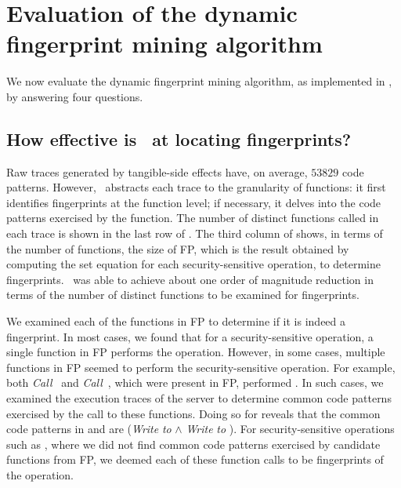 \section{Evaluation of the dynamic fingerprint mining algorithm}
\label{chapter:dynamic:evaluation}

We now evaluate the dynamic fingerprint mining algorithm, as implemented in
\aid, by answering four questions.

%
\subsection{How effective is \aid\ at locating fingerprints?} 
%
Raw traces generated by tangible-side effects have, on average, $53829$
code patterns. However, \aid\ abstracts each trace to the granularity of
functions: it first identifies fingerprints at the function level; if
necessary, it delves into the code patterns exercised by the function. The
number of distinct functions called in each trace is shown in the last row of
.  The third column of
 shows, in terms of the number of functions, the
size of FP, which is the result obtained by computing the set equation for each
security-sensitive operation, to determine fingerprints. \aid\ was able to
achieve about one order of magnitude reduction in terms of the number of
distinct functions to be examined for fingerprints.

We examined each of the functions in FP to determine if it is indeed a
fingerprint. In most cases, we found that for a security-sensitive operation, a
single function in FP performs the operation.  However, in some cases, multiple
functions in FP seemed to perform the security-sensitive operation. For
example, both \textit{Call}~ and
\textit{Call}~, which were present in FP, performed
. In such cases, we examined the execution traces of the server
to determine common code patterns exercised by the call to these functions.
Doing so for  reveals that the common code patterns in
 and  are (\textit{Write} 
\textit{to}  $\wedge$ \textit{Write} 
\textit{to} ). For security-sensitive operations such
as , where we did not find common code patterns
exercised by candidate functions from FP, we deemed each of these function
calls to be fingerprints of the operation.
                 
